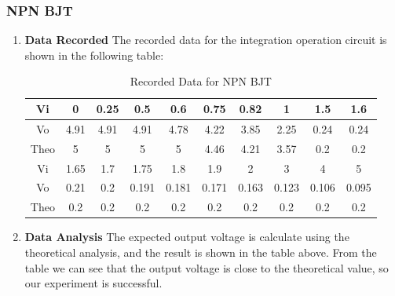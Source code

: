     \subsubsection{NPN BJT}
    \begin{enumerate}[I]
        \item \textbf{Data Recorded}\newline
            The recorded data for the integration operation circuit is shown in the following table:
            \begin{table}[H]
                \centering
                \begin{tabular}{|c|c|c|c|c|c|c|c|c|c|}
                    \hline
                    Vi   & 0    & 0.25 & 0.5   & 0.6   & 0.75  & 0.82  & 1     & 1.5   & 1.6   \\ \hline
                    Vo   & 4.91 & 4.91 & 4.91  & 4.78  & 4.22  & 3.85  & 2.25  & 0.24  & 0.24  \\ \hline
                    Theo & 5    & 5    & 5     & 5     & 4.46  & 4.21  & 3.57  & 0.2   & 0.2   \\ \hline
                    Vi   & 1.65 & 1.7  & 1.75  & 1.8   & 1.9   & 2     & 3     & 4     & 5     \\ \hline
                    Vo   & 0.21 & 0.2  & 0.191 & 0.181 & 0.171 & 0.163 & 0.123 & 0.106 & 0.095 \\ \hline
                    Theo & 0.2  & 0.2  & 0.2   & 0.2   & 0.2   & 0.2   & 0.2     & 0.2     & 0.2     \\ \hline
                \end{tabular}
                \caption{Recorded Data for NPN BJT}
                \label{tab:}
            \end{table}
        \item \textbf{Data Analysis}\newline
            The expected output voltage is calculate using the theoretical analysis, and the result is shown in the table above. From the table we can see that the output voltage is close to the theoretical value, so our experiment is successful.
    \end{enumerate}

